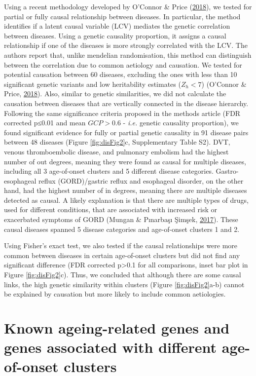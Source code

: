 \documentclass[12pt,twoside]{unicam}
\begin{document}
Using a recent methodology developed by O'Connor \& Price (\protect\hyperlink{ref-OConnor2018}{2018}), we tested for partial or fully causal relationship between diseases. In particular, the method identifies if a latent causal variable (LCV) mediates the genetic correlation between diseases. Using a genetic causality proportion, it assigns a causal relationship if one of the diseases is more strongly correlated with the LCV. The authors report that, unlike mendelian randomisation, this method can distinguish between the correlation due to common aetiology and causation. We tested for potential causation between 60 diseases, excluding the ones with less than 10 significant genetic variants and low heritability estimates (\(Z_h<7\)) (O'Connor \& Price, \protect\hyperlink{ref-OConnor2018}{2018}). Also, similar to genetic similarities, we did not calculate the causation between diseases that are vertically connected in the disease hierarchy. Following the same significance criteria proposed in the methods article (FDR corrected p≤0.01 and mean \(GCP>0.6\) - \emph{i.e.} genetic causality proportion), we found significant evidence for fully or partial genetic causality in 91 disease pairs between 48 diseases (Figure \ref{fig:disFig2}c, Supplementary Table S2). DVT, venous thromboembolic disease, and pulmonary embolism had the highest number of out degrees, meaning they were found as causal for multiple diseases, including all 3 age-of-onset clusters and 5 different disease categories. Gastro-esophageal reflux (GORD)/gastric reflux and esophageal disorder, on the other hand, had the highest number of in degrees, meaning there are multiple diseases detected as causal. A likely explanation is that there are multiple types of drugs, used for different conditions, that are associated with increased risk or exacerbated symptoms of GORD (Mungan \& Pınarbaşı Şimşek, \protect\hyperlink{ref-Mungan2017}{2017}). These causal diseases spanned 5 disease categories and age-of-onset clusters 1 and 2.

Using Fisher's exact test, we also tested if the causal relationships were more common between diseases in certain age-of-onset clusters but did not find any significant difference (FDR corrected p\textgreater0.1 for all comparisons, inset bar plot in Figure \ref{fig:disFig2}c). Thus, we concluded that although there are some causal links, the high genetic similarity within clusters (Figure \ref{fig:disFig2}a-b) cannot be explained by causation but more likely to include common aetiologies.

\hypertarget{known-ageing-related-genes-and-genes-associated-with-different-age-of-onset-clusters}{%
\section{Known ageing-related genes and genes associated with different age-of-onset clusters}\label{known-ageing-related-genes-and-genes-associated-with-different-age-of-onset-clusters}}
\end{document}

